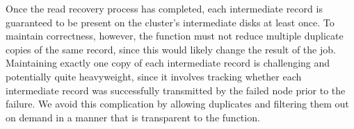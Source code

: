 Once the read recovery process has completed, each intermediate record is
guaranteed to be present on the cluster's intermediate disks at least once.  To
maintain correctness, however, the \reduce function must not reduce multiple
duplicate copies of the same record, since this would likely change the result
of the job. Maintaining exactly one copy of each intermediate record is
challenging and potentially quite heavyweight, since it involves tracking
whether each intermediate record was successfully transmitted by the failed
node prior to the failure. We avoid this complication by allowing duplicates
and filtering them out on demand in a manner that is transparent to the \reduce
function.
